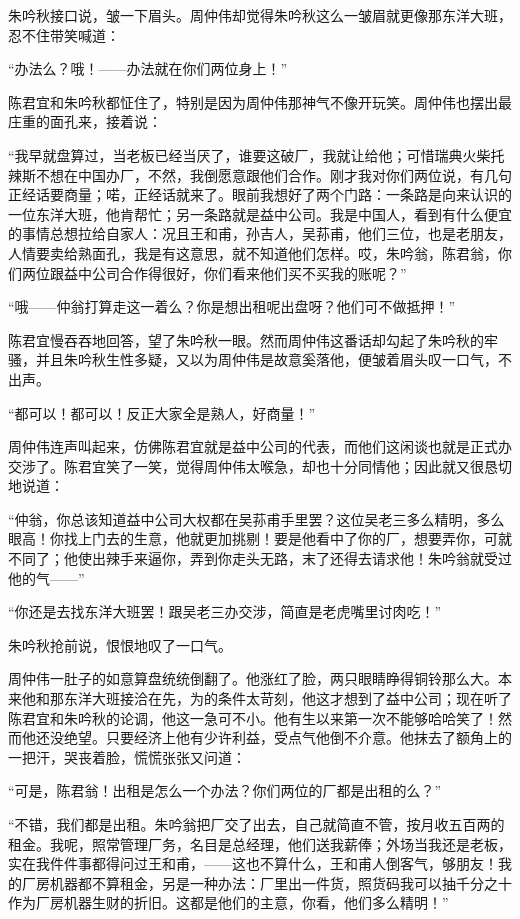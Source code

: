 \par 朱吟秋接口说，皱一下眉头。周仲伟却觉得朱吟秋这么一皱眉就更像那东洋大班，忍不住带笑喊道：
\par “办法么？哦！——办法就在你们两位身上！”
\par 陈君宜和朱吟秋都怔住了，特别是因为周仲伟那神气不像开玩笑。周仲伟也摆出最庄重的面孔来，接着说：
\par “我早就盘算过，当老板已经当厌了，谁要这破厂，我就让给他；可惜瑞典火柴托辣斯不想在中国办厂，不然，我倒愿意跟他们合作。刚才我对你们两位说，有几句正经话要商量；喏，正经话就来了。眼前我想好了两个门路：一条路是向来认识的一位东洋大班，他肯帮忙；另一条路就是益中公司。我是中国人，看到有什么便宜的事情总想拉给自家人：况且王和甫，孙吉人，吴荪甫，他们三位，也是老朋友，人情要卖给熟面孔，我是有这意思，就不知道他们怎样。哎，朱吟翁，陈君翁，你们两位跟益中公司合作得很好，你们看来他们买不买我的账呢？”
\par “哦——仲翁打算走这一着么？你是想出租呢出盘呀？他们可不做抵押！”
\par 陈君宜慢吞吞地回答，望了朱吟秋一眼。然而周仲伟这番话却勾起了朱吟秋的牢骚，并且朱吟秋生性多疑，又以为周仲伟是故意奚落他，便皱着眉头叹一口气，不出声。
\par “都可以！都可以！反正大家全是熟人，好商量！”
\par 周仲伟连声叫起来，仿佛陈君宜就是益中公司的代表，而他们这闲谈也就是正式办交涉了。陈君宜笑了一笑，觉得周仲伟太喉急，却也十分同情他；因此就又很恳切地说道：
\par “仲翁，你总该知道益中公司大权都在吴荪甫手里罢？这位吴老三多么精明，多么眼高！你找上门去的生意，他就更加挑剔！要是他看中了你的厂，想要弄你，可就不同了；他使出辣手来逼你，弄到你走头无路，末了还得去请求他！朱吟翁就受过他的气——”
\par “你还是去找东洋大班罢！跟吴老三办交涉，简直是老虎嘴里讨肉吃！”
\par 朱吟秋抢前说，恨恨地叹了一口气。
\par 周仲伟一肚子的如意算盘统统倒翻了。他涨红了脸，两只眼睛睁得铜铃那么大。本来他和那东洋大班接洽在先，为的条件太苛刻，他这才想到了益中公司；现在听了陈君宜和朱吟秋的论调，他这一急可不小。他有生以来第一次不能够哈哈笑了！然而他还没绝望。只要经济上他有少许利益，受点气他倒不介意。他抹去了额角上的一把汗，哭丧着脸，慌慌张张又问道：
\par “可是，陈君翁！出租是怎么一个办法？你们两位的厂都是出租的么？”
\par “不错，我们都是出租。朱吟翁把厂交了出去，自己就简直不管，按月收五百两的租金。我呢，照常管理厂务，名目是总经理，他们送我薪俸；外场当我还是老板，实在我件件事都得问过王和甫，——这也不算什么，王和甫人倒客气，够朋友！我的厂房机器都不算租金，另是一种办法：厂里出一件货，照货码我可以抽千分之十作为厂房机器生财的折旧。这都是他们的主意，你看，他们多么精明！”
